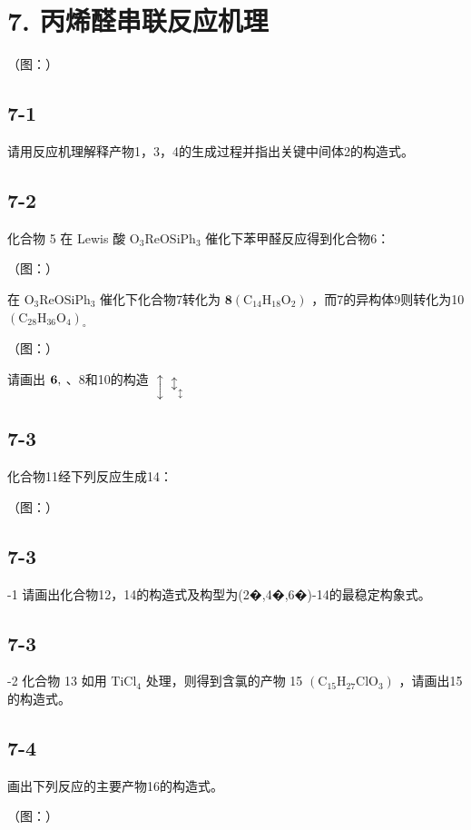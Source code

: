\section*{7. 丙烯醛串联反应机理}
（图：）

\subsection*{7-1}
请⽤反应机理解释产物1，3，4的⽣成过程并指出关键中间体2的构造式。

\subsection*{7-2}
化合物 5 在 Lewis 酸 $\mathrm { O _ { 3 } R e O S i P h _ { 3 } }$ 催化下苯甲醛反应得到化合物6：

（图：）

在 $\mathrm { O _ { 3 } R e O S i P h _ { 3 } }$ 催化下化合物7转化为 $\mathbf { 8 } \left( \mathrm { C _ { 1 4 } H _ { 1 8 } O _ { 2 } } \right)$ ，⽽7的异构体9则转化为10 $( \mathrm { C _ { 2 8 } H _ { 3 6 } O _ { 4 } } ) _ { \circ }$

（图：）

请画出 ${ \bf 6 } ,$ 、8和10的构造 $\updownarrow \updownarrow _ { \updownarrow }$

\subsection*{7-3}
化合物11经下列反应⽣成14：

（图：）

\subsection*{7-3}
-1 请画出化合物12，14的构造式及构型为(2�,4�,6�)-14的最稳定构象式。

\subsection*{7-3}
-2 化合物 13 如⽤ $\mathrm { T i C l } _ { 4 }$ 处理，则得到含氯的产物 15 $\left( \mathrm { C _ { 1 5 } H _ { 2 7 } C l O _ { 3 } } \right)$ ，请画出15的构造式。

\subsection*{7-4}
画出下列反应的主要产物16的构造式。

（图：）
